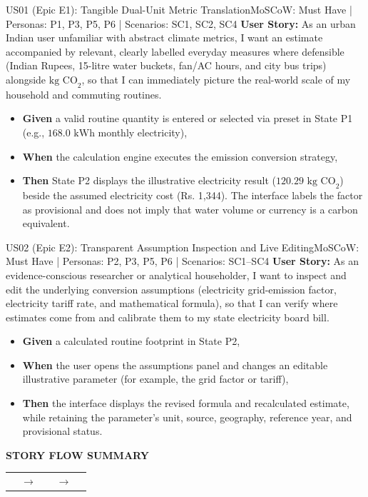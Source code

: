 \documentclass[12pt,a4paper]{article}
\makeatletter
\renewcommand{\arraystretch}{1.38}
\newcommand{\storyflow}[3]{%
  \par\Needspace{5\baselineskip}\vspace{0.08cm}%
  \begin{tcolorbox}[
    enhanced,width=\linewidth,
    colback=RowGray!72,colframe=RuleGray,
    boxrule=0.5pt,arc=1.2mm,
    borderline west={2pt}{0pt}{Teal},
    left=9pt,right=9pt,top=9pt,bottom=9pt,
    before skip=0pt,after skip=0pt
  ]
    {\sffamily\footnotesize\bfseries\color{Teal}STORY FLOW SUMMARY}\par
    \vspace{0.18cm}
    \renewcommand{\arraystretch}{1.0}%
    \begin{tabularx}{\linewidth}{@{}>{\centering\arraybackslash}X
      >{\centering\arraybackslash}p{0.52cm}
      >{\centering\arraybackslash}X
      >{\centering\arraybackslash}p{0.52cm}
      >{\centering\arraybackslash}X@{}}
      \fcolorbox{Teal!42}{white}{%
        \parbox[c][1.65cm][c]{\dimexpr\hsize-2\fboxsep-2\fboxrule\relax}{%
          \centering\sffamily\small\bfseries\color{Teal}01\par
          \vspace{3pt}\normalfont\small\color{Navy}#1}} &
      {\color{Teal}\normalsize$\to$} &
      \fcolorbox{Teal!42}{white}{%
        \parbox[c][1.65cm][c]{\dimexpr\hsize-2\fboxsep-2\fboxrule\relax}{%
          \centering\sffamily\small\bfseries\color{Teal}02\par
          \vspace{3pt}\normalfont\small\color{Navy}#2}} &
      {\color{Teal}\normalsize$\to$} &
      \fcolorbox{Teal!42}{white}{%
        \parbox[c][1.65cm][c]{\dimexpr\hsize-2\fboxsep-2\fboxrule\relax}{%
          \centering\sffamily\small\bfseries\color{Teal}03\par
          \vspace{3pt}\normalfont\small\color{Navy}#3}}
    \end{tabularx}
  \end{tcolorbox}
  \vspace{0.08cm}%
}
\makeatother
\begin{document}
\clearpage
\Needspace{0.30\textheight}
\begin{storybox}{US01 (Epic E1): Tangible Dual-Unit Metric Translation}{MoSCoW: Must Have | Personas: P1, P3, P5, P6 | Scenarios: SC1, SC2, SC4}
\textbf{User Story:} As an urban Indian user unfamiliar with abstract climate metrics, I want an estimate accompanied by relevant, clearly labelled everyday measures where defensible (Indian Rupees, 15-litre water buckets, fan/AC hours, and city bus trips) alongside $\text{kg CO}_2$, so that I can immediately picture the real-world scale of my household and commuting routines.
\begin{itemize}
    \item \textbf{Given} a valid routine quantity is entered or selected via preset in State P1 (e.g., $168.0\text{ kWh}$ monthly electricity),
    \item \textbf{When} the calculation engine executes the emission conversion strategy,
    \item \textbf{Then} State P2 displays the illustrative electricity result ($120.29\text{ kg CO}_2$) beside the assumed electricity cost (Rs. 1,344). The interface labels the factor as provisional and does not imply that water volume or currency is a carbon equivalent.
\end{itemize}
\end{storybox}

\vspace{0.28cm}

\Needspace{0.30\textheight}
\begin{storybox}{US02 (Epic E2): Transparent Assumption Inspection and Live Editing}{MoSCoW: Must Have | Personas: P2, P3, P5, P6 | Scenarios: SC1--SC4}
\textbf{User Story:} As an evidence-conscious researcher or analytical householder, I want to inspect and edit the underlying conversion assumptions (electricity grid-emission factor, electricity tariff rate, and mathematical formula), so that I can verify where estimates come from and calibrate them to my state electricity board bill.
\begin{itemize}
    \item \textbf{Given} a calculated routine footprint in State P2,
    \item \textbf{When} the user opens the assumptions panel and changes an editable illustrative parameter (for example, the grid factor or tariff),
    \item \textbf{Then} the interface displays the revised formula and recalculated estimate, while retaining the parameter's unit, source, geography, reference year, and provisional status.
\end{itemize}
\end{storybox}
\storyflow{Enter valid routine quantity}{View labelled estimate}{Inspect or edit assumptions}
\end{document}
